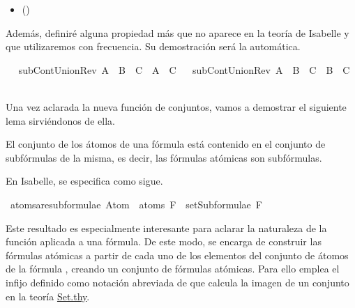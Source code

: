 \begin{isabellebody}
\begin{isamarkuptext}
 \begin{itemize}
  \item[]  \hfill ()
  \end{itemize}

Además, definiré alguna propiedad más que no aparece en la teoría de Isabelle y que utilizaremos
con frecuencia. Su demostración será la automática.%
\end{isamarkuptext}\isamarkuptrue%
\ \isanewline
{}\isamarkupfalse%
\ subContUnionRev{}{\isacharcolon}\ {\isachardoublequoteopen}A\ {\isasymunion}\ B\ {\isasymsubseteq}\ C\ {\isasymLongrightarrow}\ A\ {\isasymsubseteq}\ C{\isachardoublequoteclose}\isanewline
\ %
\isadelimproof
%
\endisadelimproof
%
\isatagproof
%
\endisatagproof
{\isafoldproof}%
%
\isadelimproof
%
\endisadelimproof
\isanewline
{}\isamarkupfalse%
\ subContUnionRev{}{\isacharcolon}\ {\isachardoublequoteopen}A\ {\isasymunion}\ B\ {\isasymsubseteq}\ C\ {\isasymLongrightarrow}\ B\ {\isasymsubseteq}\ C{\isachardoublequoteclose}\isanewline
\ %
\isadelimproof
%
\endisadelimproof
%
\isatagproof
%
\endisatagproof
{\isafoldproof}%
%
\isadelimproof
%
\endisadelimproof
%
\begin{isamarkuptext}%
Una vez aclarada la nueva función de conjuntos, vamos a demostrar el siguiente lema 
sirviéndonos de ella.

 \begin{lema}
    El conjunto de los átomos de una fórmula está contenido en el conjunto de subfórmulas de la 
    misma, es decir, las fórmulas atómicas son subfórmulas.
  \end{lema}

En Isabelle, se especifica como sigue.%
\end{isamarkuptext}\isamarkuptrue%
\isamarkupfalse%
\ atoms{\isacharunderscore}are{\isacharunderscore}subformulae{\isacharcolon}\ {\isachardoublequoteopen}Atom\ {\isacharbackquote}\ atoms\ F\ {\isasymsubseteq}\ setSubformulae\ F{\isachardoublequoteclose}\isanewline
%
\isadelimproof
\ \ %
\endisadelimproof
%
\isatagproof
{}\isamarkupfalse%
%
\endisatagproof
{\isafoldproof}%
%
\isadelimproof
%
\endisadelimproof
%
\begin{isamarkuptext}%
Este resultado es especialmente interesante para aclarar la naturaleza de la función 
 aplicada a una fórmula. De este modo,  se encarga de 
construir las fórmulas atómicas a partir de cada uno de los elementos del conjunto de átomos de la 
fórmula , creando un conjunto de fórmulas atómicas. Para ello emplea el infijo \isa{{\isacharbackquote}} definido como 
notación abreviada de \isa{{\isacharparenleft}{\isacharbackquote}{\isacharparenright}} que calcula la imagen de un conjunto en la teoría 
\href{https://n9.cl/qatp}{Set.thy}.


\end{isamarkuptext}
\end{isabellebody}
